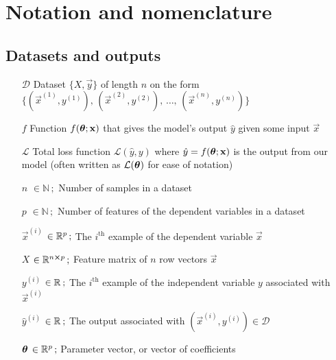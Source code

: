 



\tableofcontents
\section*{Notation and nomenclature}

\subsection*{Datasets and outputs} %
\begin{itemize}[leftmargin=2.4em]
    \item[$\mathcal{D}$] Dataset $\big\{ X, \vec{y} \big\}$ of length $n$ on the form $\big\{(\vec{x}^{(1)}, y^{(1)}),\,(\vec{x}^{(2)}, y^{(2)}),\,\dots, \, (\vec{x}^{(n)}, y^{(n)}) \big\} $
    \item[$f$] Function $f(\svec{\theta}; \vec{x})$ that gives the model's output $\hat{y}$ given some input $\vec{x}$
    \item[$\mathcal{L}$] Total loss function $\mathcal{L}(\hat{y}, y)$ where $\hat{y}= f(\svec{\theta}; \vec{x})$ is the output from our model (often written as $\mathcal{L}(\svec{\theta})$ for ease of notation)
    \item[$n$] $\in \mathbb{N}\,;$ Number of samples in a dataset
    \item[$p$] $\in \mathbb{N}\,;$ Number of features of the dependent variables in a dataset
    \item[$\vec{x}^{(i)}$] $\in\RR[p]\, ;$ The $i^\mathrm{th}$ example of the dependent variable $\vec{x}$
    \item[$X$] $\in\RR[n\cross p]\, ;$ Feature matrix of $n$ row vectors $\vec{x}$
    \item[$y^{(i)}$] $\in \RR\,;$ The $i^\mathrm{th}$ example of the independent variable $y$ associated with $\vec{x}^{(i)}$
    \item[$\hat{y}^{(i)}$] $\in \RR\,;$ The output associated with $(\vec{x}^{(i)}, y^{(i)}) \in \mathcal{D}$ 
    \item[$\svec{\theta}$] $\in\RR[p]\, ;$ Parameter vector, or vector of coefficients 
\end{itemize}
